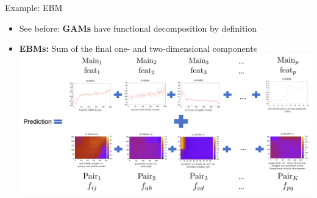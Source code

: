 \documentclass[10pt,compress,t,notes=noshow, xcolor=table]{beamer}
\begin{document}
\begin{frame}{Example: EBM}

    \begin{itemize}
        \item See before: \textbf{GAMs} have functional decomposition by definition
        \item \textbf{EBMs:} Sum of the final one- and two-dimensional components
        {
        \centering
        \includegraphics[width=\linewidth]{figure/final_ebm.png}
        }
    \end{itemize}
    
\end{frame}



\endlecture
\end{document}

